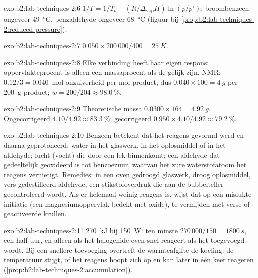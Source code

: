 \begin{solution}{exo:b2:lab-techniques-2:6}
$1/T = 1/T_b - (R/\Delta_{\mathrm{vap}}H)\ln(p/p^\circ)$: broombenzeen ongeveer \qty{49}{\degreeCelsius},
benzaldehyde ongeveer \qty{68}{\degreeCelsius} (figuur bij \cref{prop:b2:lab-techniques-2:reduced-pressure}).
\end{solution}

\begin{solution}{exo:b2:lab-techniques-2:7}
$0.050 \times 200\,000/400 = \qty{25}{K}$.
\end{solution}

\begin{solution}{exo:b2:lab-techniques-2:8}
Elke verbinding heeft haar eigen respons: oppervlakteprocent is alleen een massaprocent als de 
gelijk zijn. NMR: $0.12/3 = 0.040$~mol onzuiverheid per mol product, dus $0.040 \times 100 = \qty{4}{g}$
per \qty{200}{g} product; $w = 200/204 \approx 98.0~\%$.
\end{solution}

\begin{solution}{exo:b2:lab-techniques-2:9}
Theoretische massa $0.0300 \times 164 = \qty{4.92}{g}$. Ongecorrigeerd $4.10/4.92 \approx 83.3~\%$; gecorrigeerd
$0.950 \times 4.10/4.92 \approx 79.2~\%$.
\end{solution}

\begin{solution}{exo:b2:lab-techniques-2:10}
Benzeen betekent dat het reagens gevormd werd en daarna geprotoneerd: water in het glaswerk, in het oplosmiddel of in het
aldehyde; lucht (vocht) die door een lek binnenkomt; een aldehyde dat gedeeltelijk geoxideerd is tot benzoëzuur, waarvan het
zure waterstofatoom het reagens vernietigt. Remedies: in een oven gedroogd glaswerk, droog oplosmiddel, vers gedestilleerd
aldehyde, een stikstofoverdruk die aan de bubbelteller gecontroleerd wordt. Als er helemaal weinig reagens is, wijst dat op een
mislukte initiatie (een magnesiumoppervlak bedekt met oxide), te vermijden met verse of geactiveerde krullen.
\end{solution}

\begin{solution}{exo:b2:lab-techniques-2:11}
\qty{270}{kJ} bij \qty{150}{W}: ten minste $270\,000/150 = \qty{1800}{s}$, een half uur, en alleen als het
halogenide even snel reageert als het toegevoegd wordt. Bij een snellere toevoeging overtreft de warmteafgifte de koeling: de temperatuur stijgt,
of het reagens hoopt zich op en kan later in één keer reageren (\cref{prop:b2:lab-techniques-2:accumulation}).
\end{solution}

